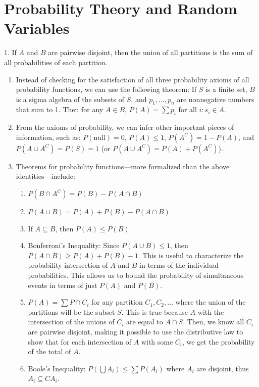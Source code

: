 \documentclass{article}
\begin{document}
\section{Probability Theory and Random Variables}
1. If \(A\) and \(B\) are pairwise disjoint, then the union of all partitions is the sum of all probabilities of each partition.
\begin{enumerate}
    \item Instead of checking for the satisfaction of all three probability axioms of all probability functions, we can use the following theorem: If \(S\) is a finite set, \(B\) is a sigma algebra of the subsets of \(S\), and \(p_1, \ldots, p_n\) are nonnegative numbers that sum to 1. Then for any \(A \in B\), \(P(A) = \sum p_i\) for all \(i : s_i \in A\).
    \item From the axioms of probability, we can infer other important pieces of information, such as: \(P(\text{null}) = 0\), \(P(A) \leq 1\), \(P(A^C) = 1 - P(A)\), and \(P(A \cup A^C) = P(S) = 1\) (or \(P(A \cup A^C) = P(A) + P(A^C)\)).
    \item Theorems for probability functions—more formalized than the above identities—include:
   \begin{enumerate}
       \item \(P(B \cap A^C) = P(B) - P(A \cap B)\)
       \item \(P(A \cup B) = P(A) + P(B) - P(A \cap B)\)
       \item If \(A \subseteq B\), then \(P(A) \leq P(B)\)
       \item Bonferroni's Inequality: Since \(P(A \cup B) \leq 1\), then \(P(A \cap B) \geq P(A) + P(B) - 1\). This is useful to characterize the probability intersection of \(A\) and \(B\) in terms of the individual probabilities. This allows us to bound the probability of simultaneous events in terms of just \(P(A)\) and \(P(B)\).
       \item \(P(A) = \sum P \cap C_i\) for any partition \(C_1, C_2, \ldots\) where the union of the partitions will be the subset \(S\). This is true because \(A\) with the intersection of the unions of \(C_i\) are equal to \(A \cap S\). Then, we know all \(C_i\) are pairwise disjoint, making it possible to use the distributive law to show that for each intersection of \(A\) with some \(C_i\), we get the probability of the total of \(A\).
       \item Boole's Inequality: \(P\left(\bigcup A_i\right) \leq \sum P(A_i)\) where \(A_i\) are disjoint, thus \(A_i \subseteq C A_i\).
   \end{enumerate}
\end{enumerate}
\end{document}
